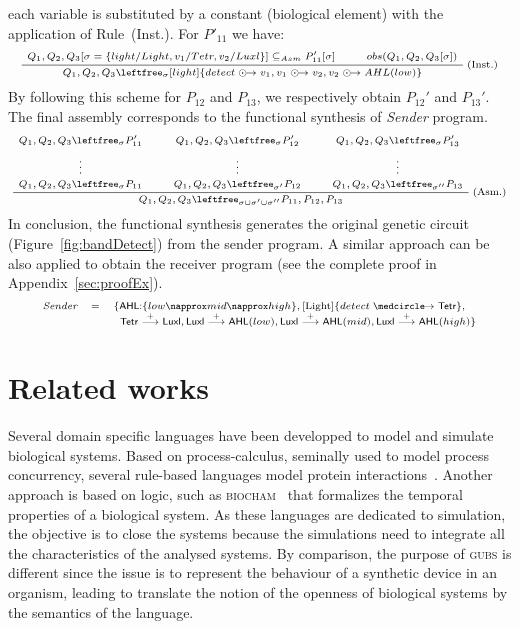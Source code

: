 \documentclass{eptcs}
\newcommand{\activate}[0]{\stackrel{+}{\reg}}
\newcounter{ti}
\begin{document}
each variable is substituted by a constant (biological element) with the application of Rule~(Inst.). For $P'_{11}$ we have:
\begin{equation*}
\scriptsize
\AxiomC{$Q_1,Q_2,Q_3[\sigma=\{light/Light,v_1/Tetr, v_2/Luxl\}] \subseteq_{Asm} P_{11}'[\sigma]$}
\AxiomC{$obs(Q_1,Q_2,Q_3[\sigma])$}
\RightLabel{(Inst.)}
\BinaryInfC{$Q_1,Q_2,Q_3\leftfree_{\sigma} \context{light}\{detect\pcause v_1, v_1\pcause v_2, v_2 \pcause AHL(low)\}$}
\DisplayProof
\end{equation*}
By following this scheme for $P_{12}$ and $P_{13}$, we respectively obtain $P_{12}'$ and $P_{13}'$.
The final assembly corresponds to the functional synthesis of \textit{Sender} program. 
\begin{equation*}
\scriptsize
\AxiomC{$Q_1,Q_2,Q_3\leftfree_{\sigma} P_{11}'$}
\noLine
\UnaryInfC{$\vdots$}
\noLine
\UnaryInfC{$Q_1,Q_2,Q_3\leftfree_{\sigma} P_{11}$}
\AxiomC{$Q_1,Q_2,Q_3\leftfree_{\sigma} P_{12}'$}
\noLine
\UnaryInfC{$\vdots$}
\noLine
\UnaryInfC{$Q_1,Q_2,Q_3\leftfree_{\sigma'} P_{12}$}
\AxiomC{$Q_1,Q_2,Q_3\leftfree_{\sigma} P_{13}'$}
\noLine
\UnaryInfC{$\vdots$}
\noLine
\UnaryInfC{$Q_1,Q_2,Q_3\leftfree_{\sigma''} P_{13}$}
\RightLabel{(Asm.)}
\TrinaryInfC{$Q_1,Q_2,Q_3\leftfree_{\sigma\cup{\sigma}'\cup{\sigma}''} P_{11},P_{12},P_{13}$}
\DisplayProof
\end{equation*}
In conclusion, the functional synthesis generates the original genetic circuit (Figure~\ref{fig:bandDetect}) from the sender program. A similar approach can be also applied to obtain the receiver program (see the complete proof in Appendix~\ref{sec:proofEx}).
\begin{equation*}
\scriptsize
\begin{array}{l c l} 
\textit{Sender}&= & \{\textsf{AHL:}\{low \napprox mid \napprox high \},\context{\text{Light}}\{detect\cause\textsf{Tetr}\},\\
&& \; \;\textsf{Tetr}\activate\textsf{Luxl}, \textsf{Luxl}\activate\textsf{AHL}(low),\textsf{Luxl}\activate\textsf{AHL}(mid),\textsf{Luxl}\activate\textsf{AHL}(high)\}\\
\end{array} 
\end{equation*}

\section{Related works}
\label{sec:related}
Several domain specific languages have been developped to model and simulate biological systems. 
Based on process-calculus, seminally used to model process concurrency, several rule-based languages model protein interactions~\cite{Priami2001,Danos07,Ciocchetta2009}. Another approach is based on logic, such as \textsc{biocham}~\cite{Calzone2006} that formalizes the temporal properties of a biological system. As these languages are dedicated to simulation, the objective is to close the systems because the simulations need to integrate all the characteristics of the analysed systems. By comparison, the purpose of \textsc{gubs} is different since the issue is to represent the behaviour of a synthetic device in an organism, leading to translate the notion of the openness of biological systems by the semantics of the language.
\end{document}
